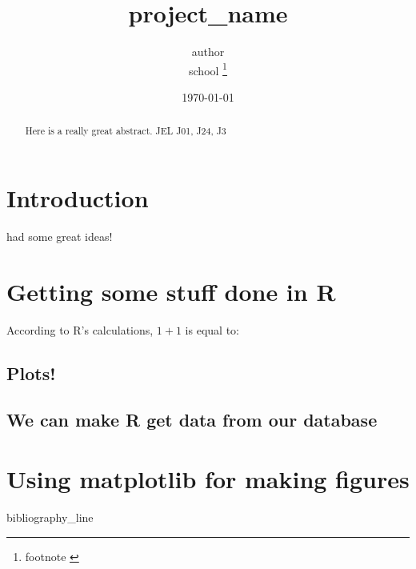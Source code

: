 \documentclass[11pt]{article}
\begin{document}
 

\title{ {{project_name}} }

\date{\today}

\author{ {{ author }} \\ {{ school }} \footnote{ {{ footnote }} } }
\maketitle

\begin{abstract}
\noindent  Here is a really great abstract.  \newline
\noindent JEL J01, J24, J3
\end{abstract} 

\section{Introduction}
\cite{smith1999wealth} had some great ideas! 

\section{Getting some stuff done in R}
According to R's calculations, $1 + 1$ is equal to:

%

\subsection{Plots!}


\subsection{We can make R get data from our database}

%

\section{Using matplotlib for making figures}




{{ bibliography_line }}
\end{document}
